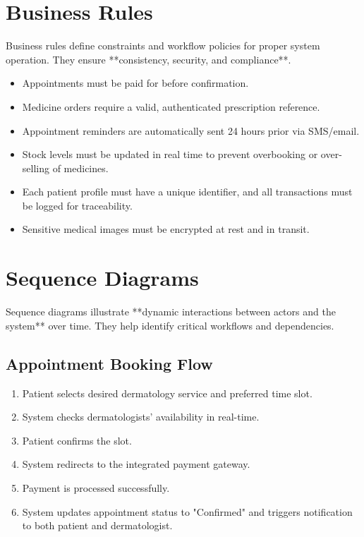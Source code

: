 \documentclass[12pt,a4paper]{report}
\begin{document}
\section{Business Rules}
Business rules define constraints and workflow policies for proper system operation. They ensure **consistency, security, and compliance**.

\begin{itemize}
    \item Appointments must be paid for before confirmation.
    \item Medicine orders require a valid, authenticated prescription reference.
    \item Appointment reminders are automatically sent 24 hours prior via SMS/email.
    \item Stock levels must be updated in real time to prevent overbooking or over-selling of medicines.
    \item Each patient profile must have a unique identifier, and all transactions must be logged for traceability.
    \item Sensitive medical images must be encrypted at rest and in transit.
\end{itemize}

\section{Sequence Diagrams}
Sequence diagrams illustrate **dynamic interactions between actors and the system** over time. They help identify critical workflows and dependencies.

\subsection{Appointment Booking Flow}
\begin{enumerate}
    \item Patient selects desired dermatology service and preferred time slot.
    \item System checks dermatologists’ availability in real-time.
    \item Patient confirms the slot.
    \item System redirects to the integrated payment gateway.
    \item Payment is processed successfully.
    \item System updates appointment status to "Confirmed" and triggers notification to both patient and dermatologist.
\end{enumerate}
\end{document}
